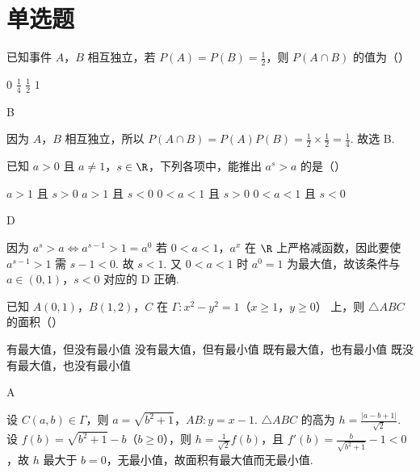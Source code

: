\section{单选题}

\begin{problem}
已知事件 \(A\)，\(B\) 相互独立，若 \(P(A)=P(B)=\frac{1}{2}\)，则 \(P(A\cap B)\) 的值为（\quad）

\choices
    {\(0\)}
    {\(\frac{1}{4}\)}
    {\(\frac{1}{2}\)}
    {\(1\)}
\end{problem}

\begin{answer}
B
\end{answer}

\begin{solution}
因为 \(A\)，\(B\) 相互独立，所以 \(P(A\cap B)=P(A)P(B)=\frac{1}{2}\times\frac{1}{2}=\frac{1}{4}\). 故选 B.
\end{solution}

\begin{problem}
已知 \(a>0\) 且 \(a\ne1\)，\(s\in\R\)，下列各项中，能推出 \(a^s>a\) 的是（\quad）

\choices
    {\(a>1\) 且 \(s>0\)}
    {\(a>1\) 且 \(s<0\)}
    {\(0<a<1\) 且 \(s>0\)}
    {\(0<a<1\) 且 \(s<0\)}
\end{problem}

\begin{answer}
D
\end{answer}

\begin{solution}
因为
\(
a^s>a\iff a^{s-1}>1=a^0
\)
若 \(0<a<1\)，\(a^x\) 在 \(\R\) 上严格减函数，因此要使 \(a^{s-1}>1\) 需 \(s-1<0\). 故 \(s<1\). 又 \(0<a<1\) 时 \(a^0=1\) 为最大值，故该条件与 \(a\in(0,1)\)，\(s<0\) 对应的 D 正确.
\end{solution}

\begin{problem}
已知 \(A(0,1)\)，\(B(1,2)\)，\(C\) 在 \(\Gamma:x^2-y^2=1\)（\(x\ge1\)，\(y\ge0\)） 上，则 \(\triangle ABC\) 的面积（\quad）

\choices
    {有最大值，但没有最小值}
    {没有最大值，但有最小值}
    {既有最大值，也有最小值}
    {既没有最大值，也没有最小值}
\end{problem}

\begin{answer}
A
\end{answer}

\begin{solution}
设 \(C(a,b)\in\Gamma\)，则 \(a=\sqrt{b^2+1}\)，\(AB: y=x-1\). \(\triangle ABC\) 的高为 \(h=\frac{|a-b+1|}{\sqrt2}\).
设 \(f(b)=\sqrt{b^2+1}-b\)（\(b\ge0\)），则 \(h=\frac{1}{\sqrt2}f(b)\)，且 \(f'(b)=\frac{b}{\sqrt{b^2+1}}-1<0\)，故 \(h\) 最大于 \(b=0\)，无最小值，故面积有最大值而无最小值.
\end{solution}

